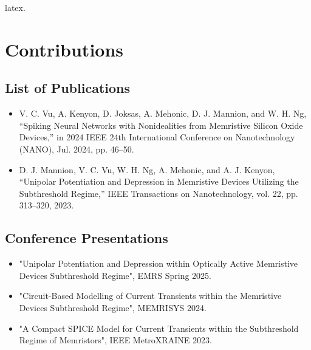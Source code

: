 
\begin{impact}      

\noindent latex.
\\

\clearpage
\thispagestyle{empty}
\section*{\centering Contributions}

\subsection*{List of Publications}
\begin{itemize}
    \item V. C. Vu, A. Kenyon, D. Joksas, A. Mehonic, D. J. Mannion, and W. H. Ng, “Spiking Neural Networks with Nonidealities from Memristive Silicon Oxide Devices,” in 2024 IEEE 24th International Conference on Nanotechnology (NANO), Jul. 2024, pp. 46–50.
    \item D. J. Mannion, V. C. Vu, W. H. Ng, A. Mehonic, and A. J. Kenyon, “Unipolar Potentiation and Depression in Memristive Devices Utilizing the Subthreshold Regime,” IEEE Transactions on Nanotechnology, vol. 22, pp. 313–320, 2023.
\end{itemize}

\subsection*{Conference Presentations}

\begin{itemize}
    \item "Unipolar Potentiation and Depression within Optically Active Memristive Devices Subthreshold Regime", EMRS Spring 2025.
    \item "Circuit-Based Modelling of Current Transients within the Memristive Devices Subthreshold Regime", MEMRISYS 2024.
    \item "A Compact SPICE Model for Current Transients within the Subthreshold Regime of Memristors", IEEE MetroXRAINE 2023.
  \end{itemize}

\end{impact}
